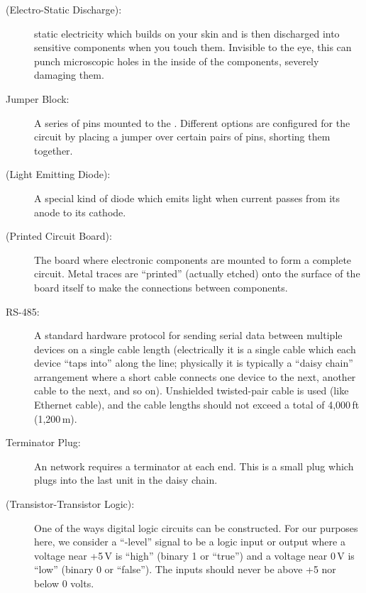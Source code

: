 \documentclass[letterpaper,twoside,onecolumn,openright,final]{memoir}
\begin{document}
\begin{description}
	\item[ (Electro-Static Discharge):]
		static electricity which builds on your skin and is then discharged into sensitive
		components when you touch them.  Invisible to the eye, this can punch microscopic holes
		in the inside of the components, severely damaging them.
	\item[Jumper Block:]
		A series of pins mounted to the .  Different options are configured for the
		circuit by placing a jumper over certain pairs of pins, shorting them together.
	\item[ (Light Emitting Diode):]
		A special kind of diode which emits light when current passes from its anode to its cathode.
	\item[ (Printed Circuit Board):]
		The board where electronic components are mounted to form a complete circuit.  Metal
		traces are ``printed'' (actually etched) onto the surface of the board itself to make the
		connections between components.
	\item[RS-485:]
		A standard hardware protocol for sending serial data between multiple devices on a single
		cable length (electrically it is a single cable which each device ``taps into'' along the
		line; physically it is typically a ``daisy chain'' arrangement where a short cable connects
		one device to the next, another cable to the next, and so on). Unshielded twisted-pair cable
		is used (like Ethernet cable), and the cable lengths should not exceed a total of 4,000\,ft
		(1,200\,m).
	\item[Terminator Plug:]
		An  network requires a terminator at each end.  This is a small plug which plugs into
		the last unit in the daisy chain.
	\item[ (Transistor-Transistor Logic):] One of the ways digital logic circuits can be
		constructed.  For our purposes here, we consider a ``-level'' signal to be a
		logic input or output where a voltage near +5\,V is ``high'' (binary 1 or ``true'') and a
		voltage near 0\,V is ``low'' (binary 0 or ``false'').  The inputs should never be above
		+5 nor below 0 volts.
\end{description}

 

\indexintoc
\printindex
\clearpage


\end{document}
